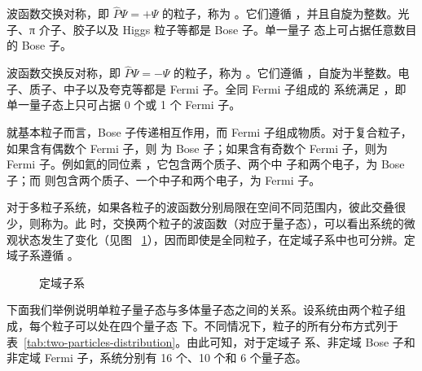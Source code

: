 波函数交换对称，即 $\hat{P}\Psi=+\Psi$ 的粒子，称为 。它们遵循
，并且自旋为整数。光子、π 介子、胶子以及 Higgs 粒子等都是 Bose 子。单一量子
态上可占据任意数目的 Bose 子。

波函数交换反对称，即 $\hat{P}\Psi=-\Psi$ 的粒子，称为 。它们遵循
，自旋为半整数。电子、质子、中子以及夸克等都是 Fermi 子。全同 Fermi 子组成的
系统满足 ，即单一量子态上只可占据 0 个或 1 个 Fermi 子。

就基本粒子而言，Bose 子传递相互作用，而 Fermi 子组成物质。对于复合粒子，如果含有偶数个 Fermi 子，则
为 Bose 子；如果含有奇数个 Fermi 子，则为 Fermi 子。例如氦的同位素 ，它包含两个质子、两个中
子和两个电子，为 Bose 子；而  则包含两个质子、一个中子和两个电子，为 Fermi 子。

对于多粒子系统，如果各粒子的波函数分别局限在空间不同范围内，彼此交叠很少，则称为。此
时，交换两个粒子的波函数（对应于量子态），可以看出系统的微观状态发生了变化（见图~%
\ref{fig:localized-sub-system}），因而即使是全同粒子，在定域子系中也可分辨。定域子系遵循
。

\begin{figure}[ht]
  \centering
  \FIGPLACEHOLDER
  \caption{定域子系}
  \label{fig:localized-sub-system}
\end{figure}

下面我们举例说明单粒子量子态与多体量子态之间的关系。设系统由两个粒子组成，每个粒子可以处在四个量子态
下。不同情况下，粒子的所有分布方式列于表~\ref{tab:two-particles-distribution}。由此可知，对于定域子
系、非定域 Bose 子和非定域 Fermi 子，系统分别有 16 个、10 个和 6 个量子态。

